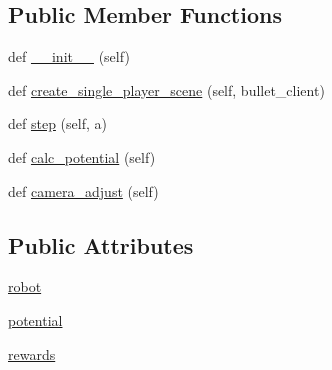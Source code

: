 \subsection*{Public Member Functions}
\begin{DoxyCompactItemize}
\item 
def \hyperlink{classpybullet-gym_1_1pybulletgym_1_1envs_1_1roboschool_1_1envs_1_1manipulation_1_1pusher__env_1_1_pusher_bullet_env_ab90043d65701e8d6dd4c8daf1b3c3682}{\+\_\+\+\_\+init\+\_\+\+\_\+} (self)
\item 
def \hyperlink{classpybullet-gym_1_1pybulletgym_1_1envs_1_1roboschool_1_1envs_1_1manipulation_1_1pusher__env_1_1_pusher_bullet_env_ad7e7c3278413a2079192c06a5051c143}{create\+\_\+single\+\_\+player\+\_\+scene} (self, bullet\+\_\+client)
\item 
def \hyperlink{classpybullet-gym_1_1pybulletgym_1_1envs_1_1roboschool_1_1envs_1_1manipulation_1_1pusher__env_1_1_pusher_bullet_env_a505d2470b92097ac58b57ca83ea79c75}{step} (self, a)
\item 
def \hyperlink{classpybullet-gym_1_1pybulletgym_1_1envs_1_1roboschool_1_1envs_1_1manipulation_1_1pusher__env_1_1_pusher_bullet_env_adcb14197081d5ba0f98049b35e2838ca}{calc\+\_\+potential} (self)
\item 
def \hyperlink{classpybullet-gym_1_1pybulletgym_1_1envs_1_1roboschool_1_1envs_1_1manipulation_1_1pusher__env_1_1_pusher_bullet_env_a51bb180695ed96271e7b0f77c7da6658}{camera\+\_\+adjust} (self)
\end{DoxyCompactItemize}
\subsection*{Public Attributes}
\begin{DoxyCompactItemize}
\item 
\hyperlink{classpybullet-gym_1_1pybulletgym_1_1envs_1_1roboschool_1_1envs_1_1manipulation_1_1pusher__env_1_1_pusher_bullet_env_a26e16458010d2972c7d2e4cfeb51aabf}{robot}
\item 
\hyperlink{classpybullet-gym_1_1pybulletgym_1_1envs_1_1roboschool_1_1envs_1_1manipulation_1_1pusher__env_1_1_pusher_bullet_env_a8badf22bca4dd584cae1e255df3f7f5b}{potential}
\item 
\hyperlink{classpybullet-gym_1_1pybulletgym_1_1envs_1_1roboschool_1_1envs_1_1manipulation_1_1pusher__env_1_1_pusher_bullet_env_ae1831756c61d283dbbf1b7ad75c7c160}{rewards}
\end{DoxyCompactItemize}


